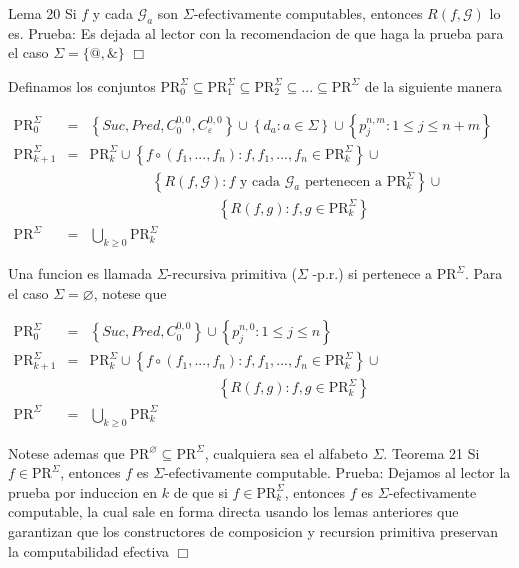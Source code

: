 Lema 20 Si \(f\) y cada \(\mathcal{G}_{a}\) son \(\Sigma \)-efectivamente computables, entonces \(R(f,\mathcal{G})\) lo es.
Prueba: Es dejada al lector con la recomendacion de que haga la prueba para el caso \( \Sigma =\{@,\& \}\) \(\Box\)

Definamos los conjuntos \(\mathrm{PR}_{0}^{\Sigma }\subseteq \mathrm{PR} _{1}^{\Sigma }\subseteq \mathrm{PR}_{2}^{\Sigma }\subseteq ...\subseteq \mathrm{PR}^{\Sigma }\) de la siguiente manera

\(\displaystyle \begin{array}{lll} \mathrm{PR}_{0}^{\Sigma } & = & \left\{ Suc,Pred,C_{0}^{0,0},C_{\varepsilon }^{0,0}\right\} \cup \left\{ d_{a}:a\in \Sigma \right\} \cup \left\{ p_{j}^{n,m}:1\leq j\leq n+m\right\} \\ \mathrm{PR}_{k+1}^{\Sigma } & = & \mathrm{PR}_{k}^{\Sigma }\cup \left\{ f\circ (f_{1},...,f_{n}):f,f_{1},...,f_{n}\in \mathrm{PR}_{k}^{\Sigma }\right\} \cup \\ & & \;\;\;\;\;\;\;\;\;\;\;\;\;\;\;\;\left\{ R(f,\mathcal{G}):f\text{ y cada }\mathcal{G}_{a}\text{ pertenecen a }\mathrm{PR}_{k}^{\Sigma }\right\} \cup \\ & & \;\;\;\;\;\;\;\;\;\;\;\;\;\;\;\;\;\;\;\;\;\;\;\;\;\;\;\;\;\;\;\;\;\left \{ R(f,g):f,g\in \mathrm{PR}_{k}^{\Sigma }\right\} \\ \mathrm{PR}^{\Sigma } & = & \bigcup_{k\geq 0}\mathrm{PR}_{k}^{\Sigma } \end{array} \)

Una funcion es llamada \(\Sigma \)-recursiva primitiva (\(\Sigma \) -p.r.) si pertenece a \(\mathrm{PR}^{\Sigma }\).
Para el caso \(\Sigma =\varnothing \), notese que

\(\displaystyle \begin{array}{lll} \mathrm{PR}_{0}^{\Sigma } & = & \left\{ Suc,Pred,C_{0}^{0,0}\right\} \cup \left\{ p_{j}^{n,0}:1\leq j\leq n\right\} \\ \mathrm{PR}_{k+1}^{\Sigma } & = & \mathrm{PR}_{k}^{\Sigma }\cup \left\{ f\circ (f_{1},...,f_{n}):f,f_{1},...,f_{n}\in \mathrm{PR}_{k}^{\Sigma }\right\} \cup \\ & & \;\;\;\;\;\;\;\;\;\;\;\;\;\;\;\;\;\;\;\;\;\;\;\;\;\;\;\;\;\;\;\;\;\left \{ R(f,g):f,g\in \mathrm{PR}_{k}^{\Sigma }\right\} \\ \mathrm{PR}^{\Sigma } & = & \bigcup_{k\geq 0}\mathrm{PR}_{k}^{\Sigma } \end{array} \)

Notese ademas que \(\mathrm{PR}^{\varnothing }\subseteq \mathrm{PR}^{\Sigma }\), cualquiera sea el alfabeto \(\Sigma \).
Teorema 21 Si \(f\in \mathrm{PR}^{\Sigma }\), entonces \(f\) es \(\Sigma \)-efectivamente computable.
Prueba: Dejamos al lector la prueba por induccion en \(k\) de que si \(f\in \mathrm{PR} _{k}^{\Sigma }\), entonces \(f\) es \(\Sigma \)-efectivamente computable, la cual sale en forma directa usando los lemas anteriores que garantizan que los constructores de composicion y recursion primitiva preservan la computabilidad efectiva \(\Box\)

